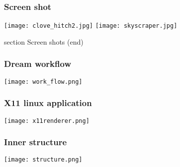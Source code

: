 \begin{frame}\frametitle{Screen shot} 
\texttt{[image: clove\_hitch2.jpg]}
\texttt{[image: skyscraper.jpg]}
\end{frame}

 section Screen shots (end)

\begin{frame}\frametitle{Dream workflow} 
\begin{center}
\texttt{[image: work\_flow.png]}
\end{center}
\end{frame}

\begin{frame}\frametitle{X11 linux application} 
\begin{center}
\texttt{[image: x11renderer.png]}
\end{center}
\end{frame}

\begin{frame}\frametitle{Inner structure} 
\begin{center}
\texttt{[image: structure.png]}
\end{center}
\end{frame}


